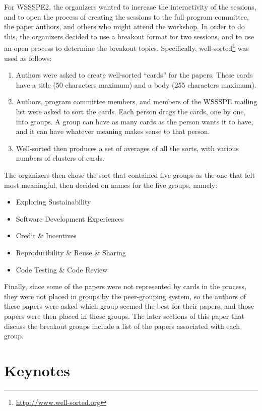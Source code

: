 \documentclass[11pt, oneside]{amsart}
\begin{document}
For WSSSPE2, the organizers wanted to increase the interactivity of the
sessions, and to open the process of creating the sessions to the full program
committee, the paper authors, and others who might attend the workshop. In order
to do this, the organizers decided to use a breakout format for two sessions,
and to use an open process to determine the breakout topics. Specifically,
well-sorted\footnote{\url{http://www.well-sorted.org}} was used as follows:
\begin{enumerate}
\item Authors were asked to create well-sorted ``cards'' for the papers. These
cards have a title (50 characters maximum) and a body (255 characters maximum).
\item Authors, program committee members, and members of the WSSSPE mailing list
were asked to sort the cards. Each person drags the cards, one by one, into
groups. A group can have as many cards as the person wants it to have, and it
can have whatever meaning makes sense to that person.
\item Well-sorted then produces a set of averages of all the sorts, with various
numbers of clusters of cards.
\end{enumerate}

The organizers then chose the sort that contained five groups as the one that
felt most meaningful, then decided on names for the five groups, namely:
\begin{itemize}
\item Exploring Sustainability
\item Software Development Experiences
\item Credit \& Incentives
\item Reproducibility \& Reuse \& Sharing
\item Code Testing \& Code Review
\end{itemize}

Finally, since some of the papers were not represented by cards in the process,
they were not placed in groups by the peer-grouping system, so the authors of
these papers were asked which group seemed the best for their papers, and those
papers were then placed in those groups. The later sections of this paper that
discuss the breakout groups include a list of the papers associated with each
group.


\section{Keynotes}
\end{document}
